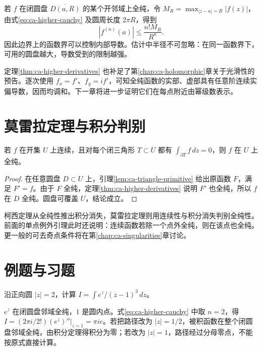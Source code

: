 \documentclass[UTF8,12pt,a4paper,fontset=fandol]{ctexbook}
\begin{document}
若 $f$ 在闭圆盘 $\overline{D(a,R)}$ 的某个开邻域上全纯，令 $M_R=\max_{|z-a|=R}|f(z)|$，由式\eqref{eq:ca-higher-cauchy} 及圆周长度 $2\pi R$，得到
\begin{equation}
  |f^{(n)}(a)|\le\frac{n!M_R}{R^n}.
  \label{eq:ca-cauchy-estimate}
\end{equation}
因此边界上的函数界可以控制内部导数。估计中半径不可忽略：在同一函数界下，可用的圆盘越大，导数受到的限制越强。

定理\ref{thm:ca-higher-derivatives} 也补足了第\ref{chap:ca-holomorphic}章关于光滑性的预告。逐次使用 $f_x=f'$、$f_y=if'$，可知全纯函数的实部、虚部具有任意阶连续实偏导数，因而均调和。下一章将进一步证明它们在每点附近由幂级数表示。

\section{莫雷拉定理与积分判别}

\begin{theorem}
\label{thm:ca-morera}
若 $f$ 在开集 $U$ 上连续，且对每个闭三角形 $T\subset U$ 都有 $\int_{\partial T}f\,dz=0$，则 $f$ 在 $U$ 上全纯。
\end{theorem}
\begin{proof}
在任意圆盘 $D\subset U$ 上，引理\ref{lem:ca-triangle-primitive} 给出原函数 $F$，满足 $F'=f$。由于 $F$ 全纯，定理\ref{thm:ca-higher-derivatives} 说明 $F'$ 也全纯，所以 $f$ 在 $D$ 全纯。圆盘可覆盖 $U$，结论成立。
\end{proof}

柯西定理从全纯性推出积分消失，莫雷拉定理则用连续性与积分消失判别全纯性。前面的单点例外引理此时还说明：连续函数若除一个点外全纯，则在该点也全纯。更一般的可去奇点条件将在第\ref{chap:ca-singularities}章讨论。

\section{例题与习题}

\begin{example}[用导数公式计算积分]
沿正向圆 $|z|=2$，计算 $I=\int e^z/(z-1)^3\,dz$。
\end{example}
\begin{solve}
$e^z$ 在闭圆盘邻域全纯，$1$ 是圆内点。式\eqref{eq:ca-higher-cauchy} 中取 $n=2$，得 $I=(2\pi i/2!)(e^z)''|_{z=1}=\pi i e$。若把路径改为 $|z|=1/2$，被积函数在整个闭圆盘邻域全纯，由积分定理得积分为零；若改为 $|z|=1$，路径经过分母零点，不能按原式直接计算。
\end{solve}
\end{document}
